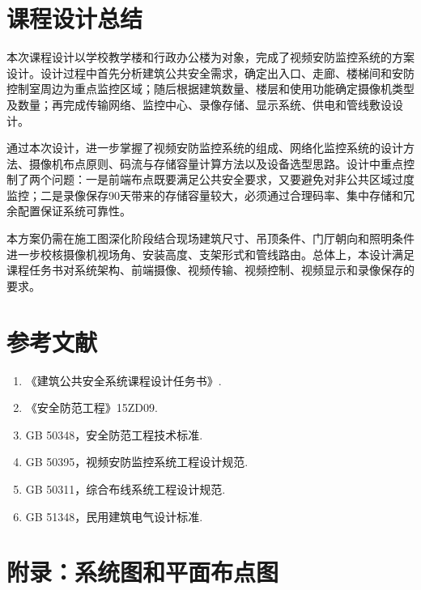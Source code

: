 \documentclass[UTF8,zihao=-4,openany]{ctexrep}
\begin{document}
\chapter{课程设计总结}
本次课程设计以学校教学楼和行政办公楼为对象，完成了视频安防监控系统的方案设计。设计过程中首先分析建筑公共安全需求，确定出入口、走廊、楼梯间和安防控制室周边为重点监控区域；随后根据建筑数量、楼层和使用功能确定摄像机类型及数量；再完成传输网络、监控中心、录像存储、显示系统、供电和管线敷设设计。

通过本次设计，进一步掌握了视频安防监控系统的组成、网络化监控系统的设计方法、摄像机布点原则、码流与存储容量计算方法以及设备选型思路。设计中重点控制了两个问题：一是前端布点既要满足公共安全要求，又要避免对非公共区域过度监控；二是录像保存90天带来的存储容量较大，必须通过合理码率、集中存储和冗余配置保证系统可靠性。

本方案仍需在施工图深化阶段结合现场建筑尺寸、吊顶条件、门厅朝向和照明条件进一步校核摄像机视场角、安装高度、支架形式和管线路由。总体上，本设计满足课程任务书对系统架构、前端摄像、视频传输、视频控制、视频显示和录像保存的要求。

\chapter*{参考文献}
\begin{enumerate}
  \item 《建筑公共安全系统课程设计任务书》.
  \item 《安全防范工程》15ZD09.
  \item GB 50348，安全防范工程技术标准.
  \item GB 50395，视频安防监控系统工程设计规范.
  \item GB 50311，综合布线系统工程设计规范.
  \item GB 51348，民用建筑电气设计标准.
\end{enumerate}

\appendix
\chapter{附录：系统图和平面布点图}

\end{document}
